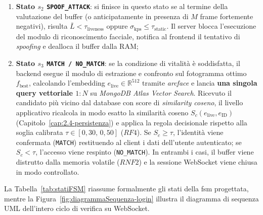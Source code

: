 \begin{enumerate}
    Qualora l'utente esca dall'inquadratura prima del completamento del buffer, la \gls{fsm} azzera l'accumulatore e riporta la sessione in $s_0$.
    Al raggiungimento degli $N$ fotogrammi ($t = N$), la macchina valuta lo score medio di vitalità $\bar{L}$ e l'indice di movimento $\sigma_{\text{kps}}$ attraverso la condizione di vitalità congiunta definita nell'Equazione~\eqref{eq:criterioLivenessBuffer}:
    \begin{equation}
        \label{eq:criterioLivenessBuffer}
        \bar{L} = \frac{1}{N} \sum_{t=1}^{N} l_t \ge \tau_{\text{liveness}} \quad \land \quad \sigma_{\text{kps}} > \tau_{\text{static}}
    \end{equation}
    dove $\bar{L}$ è la media aritmetica degli score passivi (con soglia $\tau_{\text{liveness}} = 0{,}60$) e $\tau_{\text{static}}$ è la soglia minima di movimento, sotto la quale il volto è considerato statico (Capitolo~\ref{cap:3.3-orchestrazione});

    \item \textbf{Stato $s_2$ \texttt{SPOOF\_ATTACK}}: si finisce in questo stato se al termine della valutazione del buffer (o anticipatamente in presenza di $M$ frame fortemente negativi), risulta $\bar{L} < \tau_{\text{liveness}}$ oppure $\sigma_{\text{kps}} \le \tau_{\text{static}}$. Il server blocca l'esecuzione del modulo di riconoscimento facciale, notifica al frontend il tentativo di \textit{spoofing} e dealloca il buffer dalla RAM;

    \item \textbf{Stato $s_3$ \texttt{MATCH / NO\_MATCH}}: se la condizione di vitalità è soddisfatta, il backend esegue il modulo di estrazione e confronto sul fotogramma ottimo $f_{\text{best}}$, calcolando l'embedding $e_{\text{live}} \in \mathbb{R}^{512}$ tramite \textit{\gls{arcface}} e lancia \textbf{una singola query vettoriale $1:N$} su \textit{MongoDB Atlas Vector Search}.
    Ricevuto il candidato più vicino dal database con score di \textit{similarity coseno}, il livello applicativo ricalcola in modo esatto la similarità coseno $S_c(e_{\text{live}}, e_{\text{ID}})$ (Capitolo~\ref{cap:2.4-persistenza}) e applica la regola decisionale rispetto alla soglia calibrata $\tau \in [0{,}30, \, 0{,}50]$ ($RF4$).
    Se $S_c \ge \tau$, l'identità viene confermata (\texttt{MATCH}) restituendo al client i dati dell'utente autenticato; se $S_c < \tau$, l'accesso viene respinto (\texttt{NO\_MATCH}).
    In entrambi i casi, il buffer viene distrutto dalla memoria volatile ($RNF2$) e la sessione WebSocket viene chiusa in modo controllato.
\end{enumerate}
La Tabella~\ref{tab:statiFSM} riassume formalmente gli stati della \gls{fsm} progettata, mentre la Figura~\ref{fig:diagrammaSequenza-login} illustra il diagramma di sequenza UML dell'intero ciclo di verifica su WebSocket.

